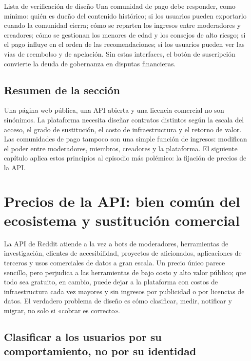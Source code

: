 \documentclass[a4paper]{article}
\begin{document}
\begin{importantbox}{Lista de verificación de diseño}
Una comunidad de pago debe responder, como mínimo: quién es dueño del contenido histórico; si los usuarios pueden exportarlo cuando la comunidad cierra; cómo se reparten los ingresos entre moderadores y creadores; cómo se gestionan los menores de edad y los consejos de alto riesgo; si el pago influye en el orden de las recomendaciones; si los usuarios pueden ver las vías de reembolso y de apelación. Sin estas interfaces, el botón de suscripción convierte la deuda de gobernanza en disputas financieras.
\end{importantbox}

\subsection{Resumen de la sección}

Una página web pública, una API abierta y una licencia comercial no son sinónimos. La plataforma necesita diseñar contratos distintos según la escala del acceso, el grado de sustitución, el costo de infraestructura y el retorno de valor. Las comunidades de pago tampoco son una simple función de ingresos: modifican el poder entre moderadores, miembros, creadores y la plataforma. El siguiente capítulo aplica estos principios al episodio más polémico: la fijación de precios de la API.
\section{Precios de la API: bien común del ecosistema y sustitución comercial}

La API de Reddit atiende a la vez a bots de moderadores, herramientas de investigación, clientes de accesibilidad, proyectos de aficionados, aplicaciones de terceros y usos comerciales de datos a gran escala. Un precio único parece sencillo, pero perjudica a las herramientas de bajo costo y alto valor público; que todo sea gratuito, en cambio, puede dejar a la plataforma con costos de infraestructura cada vez mayores y sin ingresos por publicidad o por licencias de datos. El verdadero problema de diseño es cómo clasificar, medir, notificar y migrar, no solo si «cobrar es correcto».

\subsection{Clasificar a los usuarios por su comportamiento, no por su identidad}
\end{document}

